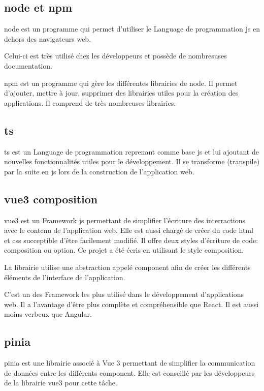 \documentclass[
    iai, %
    il, %
]{heig-tb}
\begin{document}
\subsection{\gls{node} et \gls{npm}}
\gls{node} est un programme qui permet d'utiliser le Language de programmation \gls{js} en dehors des navigateurs web.

Celui-ci est très utilisé chez les développeurs et possède de nombresuses documentation. 

\gls{npm} est un programme qui gère les différentes librairies de \gls{node}.
Il permet d'ajouter, mettre à jour, supprimer des librairies utiles pour la création des applications.
Il comprend de très nombreuses librairies.

\subsection{\gls{ts}}
\gls{ts} est un Language de programmation reprenant comme base \gls{js} et lui ajoutant de nouvelles fonctionnalités utiles pour le développement.
Il se transforme (transpile) par la suite en \gls{js} lors de la construction de l'application web.

\subsection{\gls{vue3} composition}
\gls{vue3} est un Framework \gls{js} permettant de simplifier l'écriture des interractions avec le contenu de l'application web.
Elle est aussi chargé de créer du code \gls{html} et \gls{css} succeptible d'être facilement modifié.
Il offre deux styles d'écriture de code: composition ou option.
Ce projet a été écris en utilisant le style composition.

La librairie utilise une abstraction appelé component afin de créer les différents éléments de l'interface de l'application.

C'est un des Framework les plus utilisé dans le développement d'applications web.
Il a l'avantage d'être plus complète et compréhensible que React. Il est aussi moins verbeux que Angular.

\subsection{\gls{pinia}}
\gls{pinia} est une librairie associé à Vue 3 permettant de simplifier la communication de données entre les différents component.
Elle est conseillé par les développeurs de la librairie \gls{vue3} pour cette tâche.
\end{document}
